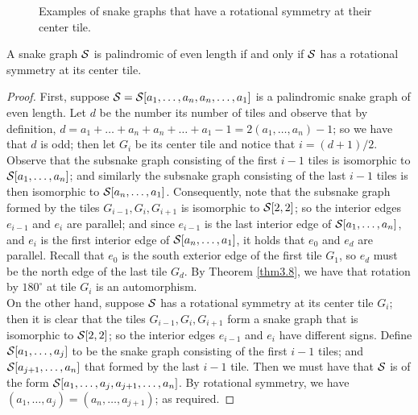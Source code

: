\begin{figure}[!htb]
   \begin{minipage}{0.48\textwidth}
     \centering
   \end{minipage}\hfill
   \begin{minipage}{0.48\textwidth}
     \centering
   \end{minipage}
   \caption{\label{fig3.1}Examples of snake graphs that have a rotational symmetry at their center tile.}
\end{figure}
   \begin{theorem}\label{thm3.10}
       A snake graph $\mathcal{S}$ is palindromic of even length if and only if $\mathcal{S}$ has a rotational symmetry at its center tile.
   \end{theorem}
   \begin{proof}
       First, suppose $\mathcal{S} = \mathcal{S}[a_1,\dots,a_n,a_n,\dots,a_1]$ is a palindromic snake graph of even length. Let $d$ be the number its number of tiles and observe that by definition, $d = a_1+\dots+a_n + a_n + \dots+ a_1 -1 = 2(a_1,\dots,a_n) -1$; so we have that $d$ is odd; then let $G_i$ be its center tile and notice that $i = (d+1)/2$. Observe that the subsnake graph consisting of the first $i-1$ tiles is isomorphic to $\mathcal{S}[a_1,\dots,a_n]$; and similarly the subsnake graph consisting of the last $i-1$ tiles is then isomorphic to $\mathcal{S}[a_n,\dots,a_1]$. Consequently, note that the subsnake graph formed by the tiles $G_{i-1},G_i,G_{i+1}$ is isomorphic to $\mathcal{S}[2,2]$; so the interior edges $e_{i-1}$ and $e_i$ are parallel; and since $e_{i-1}$ is the last interior edge of $\mathcal{S}[a_1,\dots,a_n]$, and $e_i$ is the first interior edge of $\mathcal{S}[a_n,\dots,a_1]$, it holds that $e_0$ and $e_d$ are parallel. Recall that $e_0$ is the south exterior edge of the first tile $G_1$, so $e_d$ must be the north edge of the last tile $G_d$. By Theorem \ref{thm3.8}, we have that rotation by $180^{\circ}$ at tile $G_i$ is an automorphism.
       \\

       On the other hand, suppose $\mathcal{S}$ has a rotational symmetry at its center tile $G_i$; then it is clear that the tiles $G_{i-1},G_i,G_{i+1}$ form a snake graph that is isomorphic to $\mathcal{S}[2,2]$; so the interior edges $e_{i-1}$ and $e_i$ have different signs. Define $\mathcal{S}[a_1,\dots,a_j]$ to be the snake graph consisting of the first $i-1$ tiles; and $\mathcal{S}[a_{j+1},\dots,a_n]$ that formed by the last $i-1$ tile. Then we must have that $\mathcal{S}$ is of the form $\mathcal{S}[a_1,\dots,a_j,a_{j+1},\dots,a_n]$. By rotational symmetry, we have $(a_1,\dots,a_j) = (a_n,\dots,a_{j+1})$; as required. 
   \end{proof}
